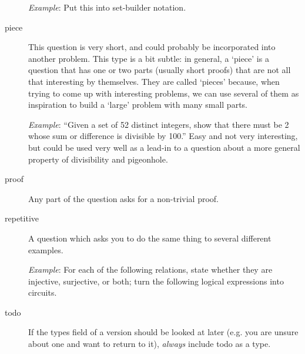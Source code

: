 \begin{description}
      \textit{Example}: Put this into set-builder notation.
      \item[piece] This question is very short, and could probably be incorporated into another problem. This type is a bit subtle: in general, a `piece' is a question that has one or two parts (usually short proofs) that are not all that interesting by themselves. They are called `pieces' because, when trying to come up with interesting problems, we can use several of them as inspiration to build a `large' problem with many small parts.
      
      \textit{Example}: ``Given a set of 52 distinct integers, show that there must be 2 whose sum or difference is divisible by 100.'' Easy and not very interesting, but could be used very well as a lead-in to a question about a more general property of divisibility and pigeonhole.
      \item[proof] Any part of the question asks for a non-trivial proof. 
      \item[repetitive] A question which asks you to do the same thing to several different examples.
      
      \textit{Example}: For each of the following relations, state whether they are injective, surjective, or both; turn the following logical expressions into circuits.
      \item[todo] If the types field of a version should be looked at later (e.g. you are unsure about one and want to return to it), \textit{always} include todo as a type.
    \end{description}
